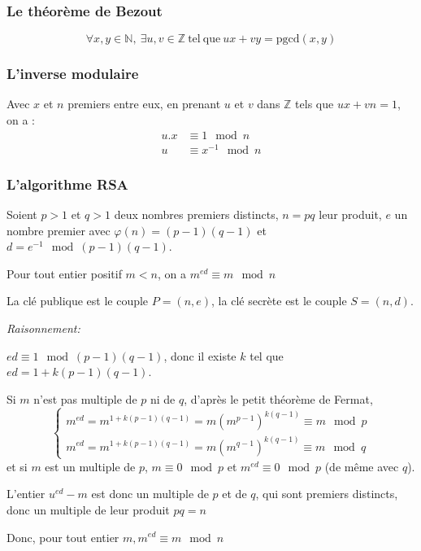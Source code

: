 \subsubsection{Le théorème de Bezout}
$$ \forall x,y \in \mathbb{N},\ \exists u , v \in \mathbb{Z}\ \mathrm{tel\ que}\ ux+vy=\mathrm{pgcd}(x,y) $$

\subsubsection{L'inverse modulaire}
Avec $x$ et $n$ premiers entre eux, en prenant $u$ et $v$ dans $\mathbb{Z}$ tels que
$ux+vn=1$, on a : 
\begin{align*} 
  u.x &\equiv 1  \mod n  \\
  u &\equiv x^{-1} \mod n 
\end{align*}

\subsubsection{L'algorithme RSA}

Soient $p>1$ et $q>1$ deux nombres premiers distincts, $n=pq$ leur produit,
 $e$ un nombre premier avec 
$\varphi(n) = (p-1)(q-1)$ et $d = e^{-1} \mod{(p-1)(q-1)}$.

Pour tout entier positif $m<n$, on a $m^{ed} \equiv  m \mod n$

La clé publique  est le couple $P=(n,e)$,
la clé secrète est le couple $S=(n,d)$.

\textit{Raisonnement:}

$ed\equiv 1 \mod (p-1)(q-1)$, donc il existe $k$ tel que $ed=1+k(p-1)(q-1)$.

Si $m$ n’est pas multiple de $p$ ni de $q$, 
d’après le petit théorème de Fermat,
$$
\begin{cases}
  m^{ed}= m^{1+k(p-1)(q-1)} = m (m^{p-1})^{k(q-1)} \equiv m \mod p \\ 
 
  m^{ed}= m^{1+k(p-1)(q-1)} = m (m^{q-1})^{k(q-1)} \equiv m \mod q
\end{cases}
$$
et si $m$ est un multiple de $p$, $m\equiv 0 \mod p$ et $m^{ed}\equiv 0 \mod p$ (de même avec $q$).

 L’entier $u^{ed}-m$ est donc un multiple de $p$ et de $q$, qui sont premiers distincts, 
 donc un multiple de leur produit $pq=n$

 Donc, pour tout entier $m, m^{ed} \equiv  m \mod n$

